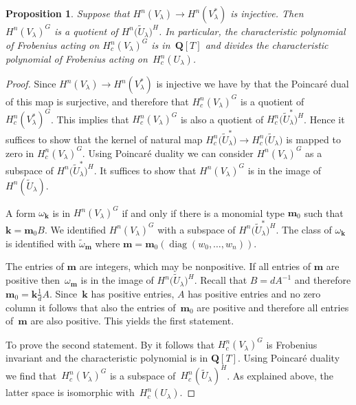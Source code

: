 \documentclass[11pt]{article}
\numberwithin{equation}{section}
\newtheorem{Proposition}[Theorem]{Proposition}
 { \theoremstyle{definition}
\newtheorem{Definition}[Theorem]{Definition}
\newtheorem{notation}[Theorem]{Notation}
\newtheorem{Example}[Theorem]{Example}
\newtheorem{Remark}[Theorem]{Remark} }
\DeclareMathOperator{\diag}{diag}
\begin{document}
\begin{Proposition}\label{prpFactor} Suppose that $H^n(V_\lambda)\to H^n(V_{\lambda}^*)$ is injective. Then $H^n(V_{\lambda})^G$ is a quotient of $H^n\big(\tilde{U}_{\lambda}\big)^H$. In particular, the characteristic polynomial of Frobenius acting on $H^n_c(V_{\lambda})^G$ is in~$\mathbf{Q}[T]$ and divides the characteristic polynomial of Frobenius acting on~$H^n_c(U_{\lambda})$.
\end{Proposition}

\begin{proof}Since $H^n(V_\lambda)\to H^n(V_{\lambda}^*)$ is injective we have by \cite{BerPoi} that the Poincar\'e dual of this map is surjective, and therefore that $H^n_c(V_\lambda)^G$ is a quotient of~$H^n_c(V_\lambda^*)^G$. This implies that $H^n_c(V_\lambda)^G$ is also a quotient of $H^n_c\big(\tilde{U}^*_\lambda\big)^H$. Hence it suf\/f\/ices to show that the kernel of natural map $H^n_c\big(\tilde{U}^*_\lambda\big)\to H^n_c\big(\tilde{U}_\lambda\big)$ is mapped to zero in $H^n_c(V_\lambda)^G$. Using Poincar\'e duality we can consider $H^n(V_\lambda)^G$ as a subspace of $H^n\big(\tilde{U}_{\lambda}^*\big)^H$. It suf\/f\/ices to show that $H^n(V_\lambda)^G$ is in the image of~$H^n(\tilde{U}_\lambda)$.

A form $\omega_{\mathbf{k}}$ is in $H^n(V_\lambda)^G$ if and only if there is a monomial type $\mathbf{m}_0$ such that $\mathbf{k}=\mathbf{m}_0 B$. We identif\/ied $H^n(V_\lambda)^G$ with a subspace of $H^n\big(\tilde{U}_\lambda^*\big)^H$. The class of $\omega_{\mathbf{k}}$ is identif\/ied with $\tilde{\omega}_{\mathbf{m}}$ where $\mathbf{m}=\mathbf{m}_0(\diag(w_0,\dots,w_n))$.

The entries of $\mathbf{m}$ are integers, which may be nonpositive. If all entries of $\mathbf{m}$ are positive then~$\omega_{\mathbf{m}}$ is in the image of $H^n\big(\tilde{U}_{\lambda}\big)^ H$. Recall that $B=d A^{-1}$ and therefore $\mathbf{m}_0=\mathbf{k} \frac{1}{d} A $. Since~$\mathbf{k}$ has positive entries, $A$ has positive entries and no zero column it follows that also the entries of~$\mathbf{m}_0$ are positive and therefore all entries of~$\mathbf{m}$ are also positive. This yields the f\/irst statement.

To prove the second statement. By \cite[Lemma~4.3]{Zetafamrec} it follows that $H^n_c(V_\lambda)^G$ is Frobenius invariant and the characteristic polynomial is in $\mathbf{Q}[T]$. Using Poincar\'e duality we f\/ind that~$H^n_c(V_\lambda)^G$ is a subspace of~$H^n_c(\tilde{U}_\lambda)^H$. As explained above, the latter space is isomorphic with~$H^n_c(U_\lambda)$.
\end{proof}
\end{document}
